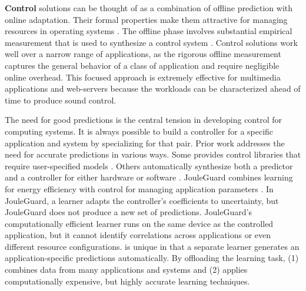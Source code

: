 \noindent \textbf{Control} solutions can be thought of as a
combination of offline prediction with online adaptation.  Their
formal properties make them attractive for managing resources in
operating systems
\cite{Steere99,KaramanolisEtAl-2005a,Hellerstein2004a}. The offline
phase involves substantial empirical measurement that is used to
synthesize a control system
\cite{grace,Wu2004,Chen2011,POET,ControlWare,Agilos,Rajkumar,Sojka,Raghavendra2008}.
Control solutions work well over a narrow range of applications, as
the rigorous offline measurement captures the general behavior of a
class of application and require negligible online overhead.  This
focused approach is extremely effective for multimedia applications
\cite{grace,grace2,flinn99,flinn2004,xtune,TCST} and web-servers
\cite{Horvarth,LuEtAl-2006a,SunDaiPan-2008a} because the workloads can
be characterized ahead of time to produce sound control.

The need for good predictions is the central tension in developing
control for computing systems.  It is always possible to build a
controller for a specific application and system by specializing for
that pair.  Prior work addresses the need for accurate predictions in
various ways.  Some provides control libraries that require
user-specified models \cite{ControlWare,Sojka,Rajkumar,POET,SWiFT}.
Others automatically synthesize both a predictor and a controller for
either hardware \cite{josep-isca2016} or software
\cite{ICSE2014,FSE2015}.  JouleGuard combines learning for energy
efficiency with control for managing application parameters
\cite{JouleGuard}.  In JouleGuard, a learner adapts the controller's
coefficients to uncertainty, but JouleGuard does not produce a new set
of predictions.  JouleGuard's computationally efficient learner runs
on the same device as the controlled application, but it cannot
identify correlations across applications or even different resource
configurations.  \SYSTEM{} is unique in that a separate learner
generates an application-specific predictions automatically.  By
offloading the learning task, \SYSTEM{} (1) combines data from many
applications and systems and (2) applies computationally expensive,
but highly accurate learning techniques.


